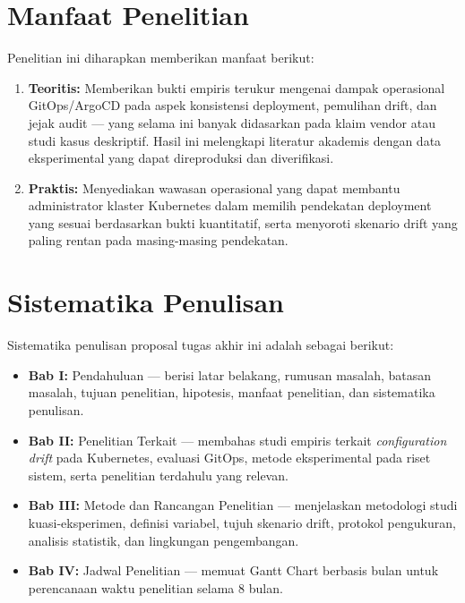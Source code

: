 \section{Manfaat Penelitian}

Penelitian ini diharapkan memberikan manfaat berikut:

\begin{enumerate}
  \item \textbf{Teoritis:} Memberikan bukti empiris terukur mengenai dampak operasional GitOps/ArgoCD pada aspek konsistensi deployment, pemulihan drift, dan jejak audit --- yang selama ini banyak didasarkan pada klaim vendor atau studi kasus deskriptif. Hasil ini melengkapi literatur akademis dengan data eksperimental yang dapat direproduksi dan diverifikasi.
  
  \item \textbf{Praktis:} Menyediakan wawasan operasional yang dapat membantu administrator klaster Kubernetes dalam memilih pendekatan deployment yang sesuai berdasarkan bukti kuantitatif, serta menyoroti skenario drift yang paling rentan pada masing-masing pendekatan.
\end{enumerate}

\section{Sistematika Penulisan}

Sistematika penulisan proposal tugas akhir ini adalah sebagai berikut:

\begin{itemize}
  \item \textbf{Bab I:} Pendahuluan --- berisi latar belakang, rumusan masalah, batasan masalah, tujuan penelitian, hipotesis, manfaat penelitian, dan sistematika penulisan.
  \item \textbf{Bab II:} Penelitian Terkait --- membahas studi empiris terkait \textit{configuration drift} pada Kubernetes, evaluasi GitOps, metode eksperimental pada riset sistem, serta penelitian terdahulu yang relevan.
  \item \textbf{Bab III:} Metode dan Rancangan Penelitian --- menjelaskan metodologi studi kuasi-eksperimen, definisi variabel, tujuh skenario drift, protokol pengukuran, analisis statistik, dan lingkungan pengembangan.
  \item \textbf{Bab IV:} Jadwal Penelitian --- memuat Gantt Chart berbasis bulan untuk perencanaan waktu penelitian selama 8 bulan.
\end{itemize}

